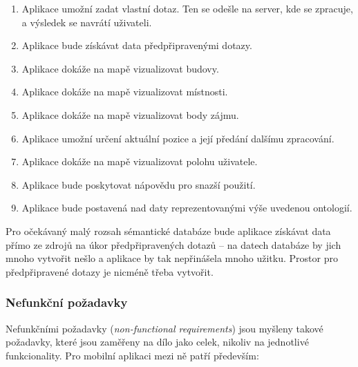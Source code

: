 \begin{enumerate}
 \item Aplikace umožní zadat vlastní  dotaz. Ten se odešle na server, kde se zpracuje, a výsledek se navrátí uživateli.
 \item Aplikace bude získávat data předpřipravenými  dotazy.
 \item Aplikace dokáže na mapě vizualizovat budovy.
 \item Aplikace dokáže na mapě vizualizovat místnosti.
 \item Aplikace dokáže na mapě vizualizovat body zájmu.
 \item Aplikace umožní určení aktuální pozice a její předání dalšímu zpracování.
 \item Aplikace dokáže na mapě vizualizovat polohu uživatele.
 \item Aplikace bude poskytovat nápovědu pro snazší použití.
 \item Aplikace bude postavená nad daty reprezentovanými výše uvedenou ontologií.
\end{enumerate}
Pro očekávaný malý rozsah sémantické databáze bude aplikace získávat data přímo ze zdrojů na úkor předpřipravených  dotazů -- na datech databáze by jich mnoho vytvořit nešlo a aplikace by tak nepřinášela mnoho užitku. Prostor pro předpřipravené  dotazy je nicméně třeba vytvořit.

\subsubsection{Nefunkční požadavky}
Nefunkčními požadavky (\textit{non-functional requirements}) jsou myšleny takové požadavky, které jsou zaměřeny na dílo jako celek, nikoliv na jednotlivé funkcionality. Pro mobilní aplikaci mezi ně patří především:


